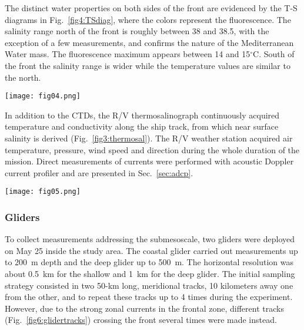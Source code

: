 \documentclass[essd]{copernicus}
\begin{document}
The distinct water properties on both sides of the front are evidenced by the T-S diagrams in Fig.~\ref{fig4:TSdiag}, where the colors represent the fluorescence. The salinity range north of the front is roughly between 38 and 38.5, with the exception of a few measurements, and confirms the nature of the Mediterranean Water mass. The fluorescence maximum appears between 14 and 15$^{\circ}$C. South of the front the salinity range is wider while the temperature values are similar to the north.

\begin{figure*}[t]
\texttt{[image: fig04.png]}
\caption{The T-S diagrams are shown separately for the casts located north and south of the front (broad, dashed line) \label{fig4:TSdiag}.}
\end{figure*}

In addition to the CTDs, the R/V thermosalinograph continuously acquired temperature and conductivity along the ship track, from which near surface salinity is derived (Fig.~\ref{fig3:thermosal}). The R/V weather station acquired air temperature, pressure, wind speed and direction during the whole duration of the mission. Direct measurements of currents were performed with acoustic Doppler current profiler and are presented in Sec.~\ref{sec:adcp}. 

\begin{figure*}[t]
\texttt{[image: fig05.png]}
\caption{The near-surface salinity (colored dots) measured by the thermosalinograph evidences the strong horizontal gradients, in agreement with the front position as obtained using the SST (broad, dashed line). The 5 subplots depict the temperature and salinity along select meridional tracks. \label{fig3:thermosal}}
\end{figure*}

\subsubsection{Gliders}

To collect measurements addressing the submesoscale, two gliders were deployed on May 25 inside the study area. The coastal glider carried out measurements up to 200~m depth and the deep glider up to 500~m. The horizontal resolution was about 0.5~km for the shallow and 1~km for the deep glider. The initial sampling strategy consisted in two 50-km long, meridional tracks, 10 kilometers away one from the other, and to repeat these tracks up to 4 times during the experiment. However, due to the strong zonal currents in the frontal zone, different tracks (Fig.~\ref{fig6:glidertracks}) crossing the front several times were made instead.
\end{document}
